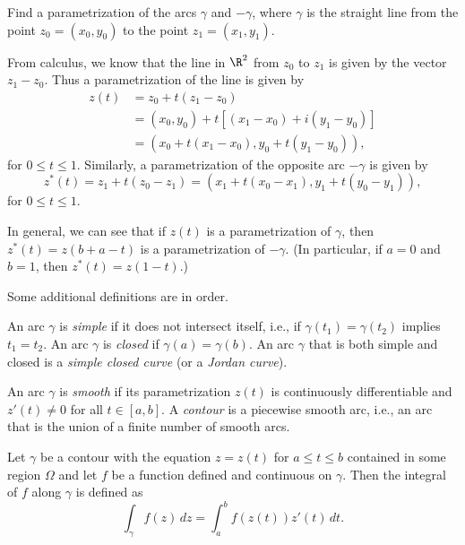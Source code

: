 \begin{example}
    Find a parametrization of the arcs \(\gamma\) and \(-\gamma\), where
    \(\gamma\) is the straight line from the point \(z_0 = (x_0, y_0)\) to the
    point \(z_1 = (x_1, y_1)\).

    \begin{solution}
        From calculus, we know that the line in \(\R^2\) from \(z_0\) to \(z_1\)
        is given by the vector \(z_1 - z_0\). Thus a parametrization of the line
        is given by
        \begin{align*}
            z(t) &= z_0 + t(z_1 - z_0) \\
            &= (x_0, y_0) + t[(x_1 - x_0) + i(y_1 - y_0)] \\
            &= (x_0 + t(x_1 - x_0), y_0 + t(y_1 - y_0)),
        \end{align*}
        for \(0 \leq t \leq 1\). Similarly, a parametrization of the opposite arc \(-\gamma\) is given by
        \[
            z^*(t) = z_1 + t(z_0 - z_1) = (x_1 + t(x_0 - x_1), y_1 + t(y_0 - y_1)),
        \]
        for \(0 \leq t \leq 1\).

        In general, we can see that if \(z(t)\) is a parametrization of
        \(\gamma\), then \(z^*(t) = z(b + a - t)\) is a parametrization of
        \(-\gamma\). (In particular, if \(a = 0\) and \(b = 1\), then \(z^*(t) =
        z(1 - t)\).)
    \end{solution}
\end{example}


Some additional definitions are in order.

\begin{definition}
    An arc \(\gamma\) is \emph{simple} if it does not intersect itself, i.e., if
    \(\gamma(t_1) = \gamma(t_2)\) implies \(t_1 = t_2\). An arc \(\gamma\) is
    \emph{closed} if \(\gamma(a) = \gamma(b)\). An arc \(\gamma\) that is both
    simple and closed is a \emph{simple closed curve} (or a \emph{Jordan
    curve}).

    An arc \(\gamma\) is \emph{smooth} if its parametrization \(z(t)\) is
    continuously differentiable and \(z'(t) \neq 0\) for all \(t \in [a, b]\). A
    \emph{contour} is a piecewise smooth arc, i.e., an arc that is the union of
    a finite number of smooth arcs.
\end{definition}


\begin{definition}
    Let \(\gamma\) be a contour with the equation \(z = z(t)\) for \(a \leq t
    \leq b\) contained in some region \(\Omega\) and let \(f\) be a function
    defined and continuous on \(\gamma\). Then the integral of \(f\) along
    \(\gamma\) is defined as
    \[
        \int_\gamma f(z) \, dz = \int_a^b f(z(t)) z'(t) \, dt.
    \]
    \label{def:complex-integral-contour}
\end{definition}

